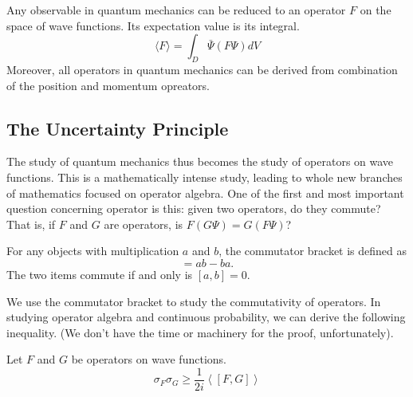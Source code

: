 \documentclass[fleqn,letterpaper]{report}
\begin{document}
Any observable in quantum mechanics can be reduced to an
operator $F$ on the space of wave functions. Its expectation
value is its integral.
\begin{equation*}
\langle F\rangle = \int_D \bar{\Psi} (F\Psi) dV
\end{equation*}
Moreover, all operators in quantum mechanics can be derived
from combination of the position and momentum opreators.

\subsection{The Uncertainty Principle}
\label{uncertainty}

The study of quantum mechanics thus becomes the study of
operators on wave functions. This is a mathematically intense
study, leading to whole new branches of mathematics focused on
operator algebra. One of the first and most important
question concerning operator is this: given two operators, do
they commute? That is, if $F$ and $G$ are operators, is
$F(G\Psi) = G(F\Psi)$? 

\begin{defn}
For any objects with multiplication $a$ and $b$, the
commutator bracket is defined as
\begin{equation*}
[a,b] = ab - ba.
\end{equation*}
The two items commute if and only is $[a,b] = 0$. 
\end{defn}
We use the commutator bracket to study the commutativity of
operators. In studying operator algebra and continuous probability, we
can derive the following inequality. (We don't have the time
or machinery for the proof, unfortunately).

\begin{thm}
Let $F$ and $G$ be operators on wave functions. 
\begin{equation*}
\sigma_F \sigma_G \geq \frac{1}{2i} \left\langle [F,G]
\right\rangle 
\end{equation*}
\end{thm}
\end{document}
